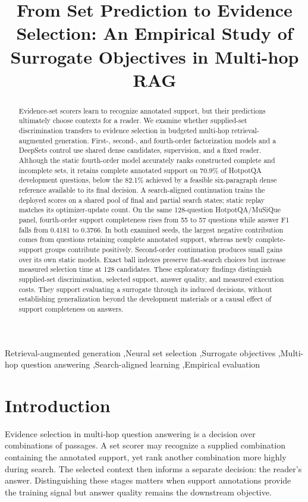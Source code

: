 \documentclass[preprint,12pt]{elsarticle}
\begin{document}
\begin{frontmatter}
\title{From Set Prediction to Evidence Selection: An Empirical Study of Surrogate Objectives in Multi-hop RAG}
\ifdefined\WithAuthors

\fi
\begin{abstract}
Evidence-set scorers learn to recognize annotated support, but their predictions ultimately choose contexts for a reader. We examine whether supplied-set discrimination transfers to evidence selection in budgeted multi-hop retrieval-augmented generation. First-, second-, and fourth-order factorization models and a DeepSets control use shared dense candidates, supervision, and a fixed reader. Although the static fourth-order model accurately ranks constructed complete and incomplete sets, it retains complete annotated support on 70.9\% of HotpotQA development questions, below the 82.1\% achieved by a feasible six-paragraph dense reference available to its final decision. A search-aligned continuation trains the deployed scores on a shared pool of final and partial search states; static replay matches its optimizer-update count. On the same 128-question HotpotQA/MuSiQue panel, fourth-order support completeness rises from 55 to 57 questions while answer F1 falls from 0.4181 to 0.3766. In both examined seeds, the largest negative contribution comes from questions retaining complete annotated support, whereas newly complete-support groups contribute positively. Second-order continuation produces small gains over its own static models. Exact ball indexes preserve flat-search choices but increase measured selection time at 128 candidates. These exploratory findings distinguish supplied-set discrimination, selected support, answer quality, and measured execution costs. They support evaluating a surrogate through its induced decisions, without establishing generalization beyond the development materials or a causal effect of support completeness on answers.
\end{abstract}
\begin{keyword}
Retrieval-augmented generation \sep Neural set selection \sep Surrogate objectives \sep Multi-hop question answering \sep Search-aligned learning \sep Empirical evaluation
\end{keyword}
\end{frontmatter}

\section{Introduction}
Evidence selection in multi-hop question answering is a decision over combinations of passages. A set scorer may recognize a supplied combination containing the annotated support, yet rank another combination more highly during search. The selected context then informs a separate decision: the reader's answer. Distinguishing these stages matters when support annotations provide the training signal but answer quality remains the downstream objective.
\end{document}
